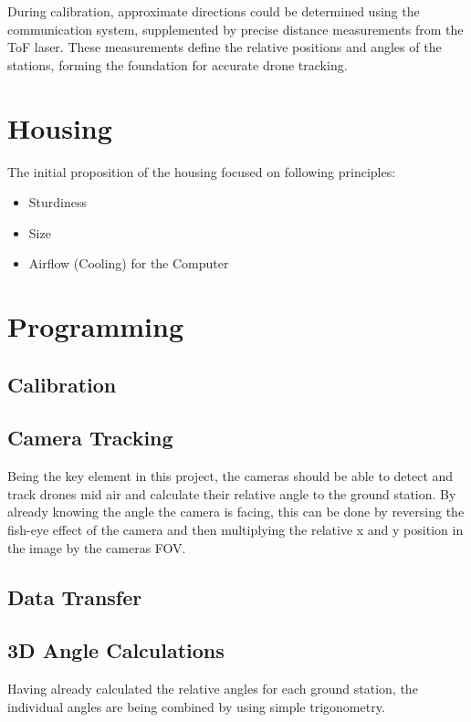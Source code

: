 During calibration, approximate directions could be determined using the communication system, supplemented by precise distance measurements from the ToF laser. These measurements define the relative positions and angles of the stations, forming the foundation for accurate drone tracking.


\section{Housing}

The initial proposition of the housing focused on following principles:
\begin{itemize}
	\item Sturdiness
	\item Size
	\item Airflow (Cooling) for the Computer
\end{itemize}


\section{Programming}

\subsection{Calibration}

\subsection{Camera Tracking}
Being the key element in this project, the cameras should be able to detect and track drones mid air and calculate their relative angle to the ground station. By already knowing the angle the camera is facing, this can be done by reversing the fish-eye effect of the camera and then multiplying the relative x and y position in the image by the cameras FOV.


\subsection{Data Transfer}


\subsection{3D Angle Calculations}
Having already calculated the relative angles for each ground station, the individual angles are being combined by using simple trigonometry. 

